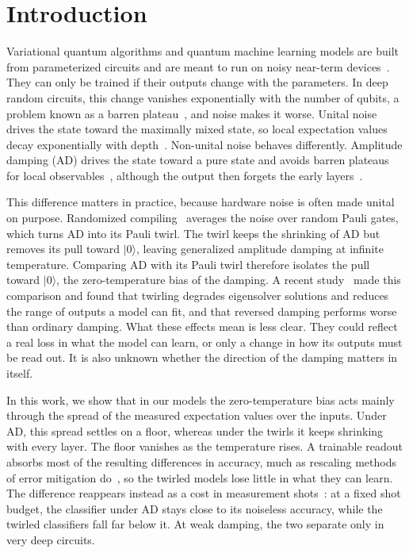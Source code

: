 \documentclass[
 aps,pra,
 twocolumn,
 superscriptaddress,
 longbibliography,
 nofootinbib
]{revtex4-2}
\providecommand{\ket}[1]{\lvert #1 \rangle}
\begin{document}
\section{Introduction}
\label{sec:intro}

Variational quantum algorithms and quantum machine learning models are built
from parameterized circuits and are meant to run on noisy near-term
devices~\cite{preskill2018nisq,cerezo2021variational,bharti2022noisy}. They can
only be trained if their outputs change with the parameters. In deep random
circuits, this change vanishes exponentially with the number of qubits, a
problem known as a barren
plateau~\cite{mcclean2018barren,cerezo2021cost,larocca2025barren}, and noise
makes it worse. Unital noise drives the state toward the maximally mixed state,
so local expectation values decay exponentially with
depth~\cite{wang2021noiseinduced,stilckfranca2021limitations}. Non-unital noise
behaves differently. Amplitude damping (AD) drives the state toward a pure state
and avoids barren plateaus for local observables~\cite{mele2026noise}, although
the output then forgets the early
layers~\cite{schumann2024emergence,singkanipa2025beyond}.

This difference matters in practice, because hardware noise is often made
unital on purpose. Randomized
compiling~\cite{wallman2016noise,hashim2021randomized} averages the noise over
random Pauli gates, which turns AD into its Pauli twirl. The twirl keeps the
shrinking of AD but removes its pull toward $\ket{0}$, leaving generalized
amplitude damping at infinite temperature. Comparing AD with its Pauli twirl
therefore isolates the pull toward $\ket{0}$, the zero-temperature bias of the
damping. A recent study~\cite{vanrossum2026biased} made this comparison and
found that twirling degrades eigensolver solutions and reduces the range of
outputs a model can fit, and that reversed damping performs worse than ordinary
damping. What these effects mean is less clear. They could reflect a real loss
in what the model can learn, or only a change in how its outputs must be read
out. It is also unknown whether the direction of the damping matters in itself.

In this work, we show that in our models the zero-temperature bias acts mainly
through the spread of the measured expectation values over the inputs. Under
AD, this spread settles on a floor, whereas under the twirls it keeps shrinking
with every layer. The floor vanishes as the temperature rises. A trainable
readout absorbs most of the resulting differences in accuracy, much as
rescaling methods of error mitigation do~\cite{vovrosh2021simple}, so the
twirled models lose little in what they can learn. The difference reappears
instead as a cost in measurement shots~\cite{wang2024errormitigation}: at a
fixed shot budget, the classifier under AD stays close to its noiseless
accuracy, while the twirled classifiers fall far below it. At weak damping, the
two separate only in very deep circuits.
\end{document}
